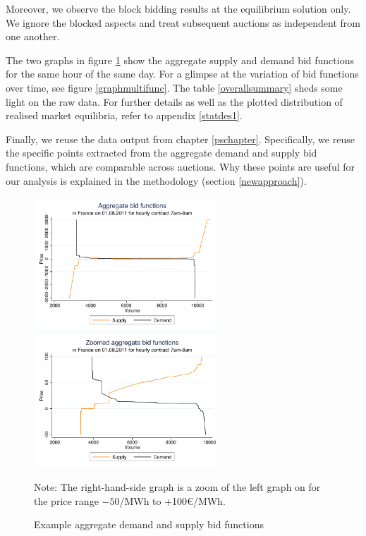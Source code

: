 Moreover, we observe the block bidding results at the equilibrium solution only. We ignore the blocked aspects and treat subsequent auctions as independent from one another.
	
The two graphs in figure \ref{examplebidfunc} show the aggregate supply and demand bid functions for the same hour of the same day. For a glimpse at the variation of bid functions over time, see figure \ref{graphmultifunc}. The table \ref{overallsummary} sheds some light on the raw data. For further details as well as the plotted distribution of realised market equilibria, refer to appendix \ref{statdes1}. 

Finally, we reuse the data output from chapter \ref{pschapter}. Specifically, we reuse the specific points extracted from the aggregate demand and supply bid functions, which are comparable across auctions. Why these points are useful for our analysis is explained in the methodology (section \ref{newapproach}).

\begin{figure}[!ht]
\begin{center} \includegraphics[height=50mm]{figch2/aggbidfuncnozoom.pdf} \hspace{0.05cm}\includegraphics[height=50mm]{figch2/aggbidfuncwithzoom.pdf} \end{center}
\caption{Example aggregate demand and supply bid functions}
\label{examplebidfunc}
{\small Note: The right-hand-side graph is a zoom of the left graph on for the price range  $-50$\EUR{}/MWh  to +100\euro /MWh.}
\end{figure}


